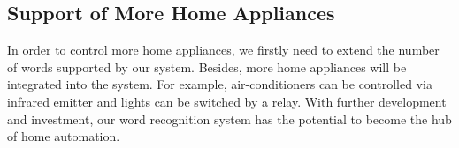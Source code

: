 
\subsection{Support of More Home Appliances}
In order to control more home appliances, we firstly need to extend the number of words supported by our system. Besides, more home appliances will be integrated into the system. For example, air-conditioners can be controlled via infrared emitter and lights can be switched by a relay. With further development and investment, our word recognition system has the potential to become the hub of home automation.
